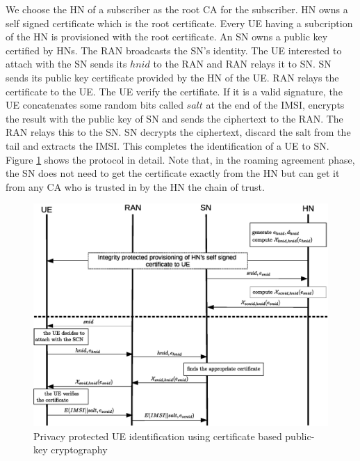 \documentclass[lnicst,sechang,a4paper]{svmultln}
\begin{document}
We choose the HN of a subscriber as the root CA for the subscriber. HN owns a self signed certificate which is the root certificate. Every UE having a subcription of the HN is provisioned with the root certificate. An SN owns a public key certified by HNs. The RAN broadcasts the SN's identity. The UE interested to attach with the SN sends its $hnid$ to the RAN and RAN relays it to SN. SN sends its public key certificate provided by the HN of the UE. RAN relays the certificate to the UE. The UE verify the certifiate. If it is a valid signature, the UE concatenates some random bits called $salt$ at the end of the IMSI, encrypts the result with the public key of SN and sends the ciphertext to the RAN. The RAN relays this to the SN. SN decrypts the ciphertext, discard the salt from the tail and extracts the IMSI. This completes the identification of a UE to SN. Figure \ref{fig:solution_certificate} shows the protocol in detail. Note that, in the roaming agreement phase, the SN does not need to get the certificate exactly from the HN but can get it from any CA who is trusted in by the HN the chain of trust.


\begin{figure}
\begin{center}
  \includegraphics[width=.98\textwidth]{public_key_variation1.eps}
\caption{Privacy protected UE identification using certificate based public-key cryptography}
\label{fig:solution_certificate}       %
\end{center}
\end{figure}
\end{document}
